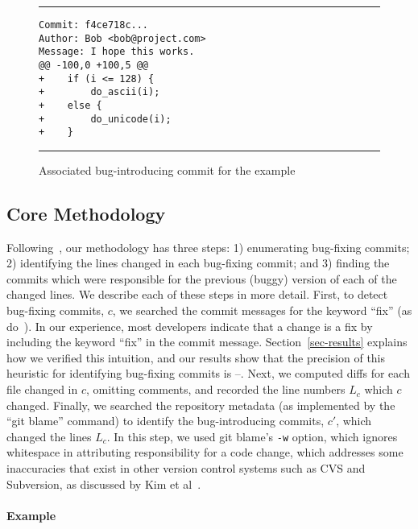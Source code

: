 \begin{figure}[t!bh]
\centering
\rule{0.92\columnwidth}{0.5pt}
\begin{minipage}[h]{0.92\columnwidth}
\begin{lstlisting}[basicstyle=\small]
Commit: f4ce718c...
Author: Bob <bob@project.com>
Message: I hope this works.
@@ -100,0 +100,5 @@
+    if (i <= 128) {
+        do_ascii(i);
+    else {
+        do_unicode(i);
+    }
\end{lstlisting}
\end{minipage}
\rule{0.92\columnwidth}{0.5pt}
\caption{\label{fig-introduction}Associated bug-introducing commit for the example}
\end{figure}

\subsection{Core Methodology}

Following~\cite{sliwerski-msr-2005}, our methodology has three steps: 1)
enumerating bug-fixing commits; 2) identifying the lines changed in each
bug-fixing commit; and 3) finding the commits which were responsible for the
previous (buggy) version of each of the changed lines. We describe each of these
steps in more detail. First, to detect bug-fixing commits, $c$, we searched the
commit messages for the keyword ``fix'' (as do~\cite{smallCommits05}). In our
experience, most developers indicate that a change is a fix by including the
keyword ``fix'' in the commit message. Section~\ref{sec-results} explains how we
verified this intuition, and our results show that the precision of this
heuristic for identifying bug-fixing commits is \postP--\linuxP. Next, we
computed diffs for each file changed in $c$, omitting comments, and recorded the
line numbers $L_c$ which $c$ changed. Finally, we searched the repository
metadata (as implemented by the ``git blame'' command) to identify the
bug-introducing commits, $c'$, which changed the lines $L_c$. In this step, we
used git blame's {\tt -w} option, which ignores whitespace in attributing
responsibility for a code change, which addresses some inaccuracies that exist
in other version control systems such as CVS and Subversion, as discussed by Kim
et al~\cite{2006-automatic}.

\paragraph{Example}

